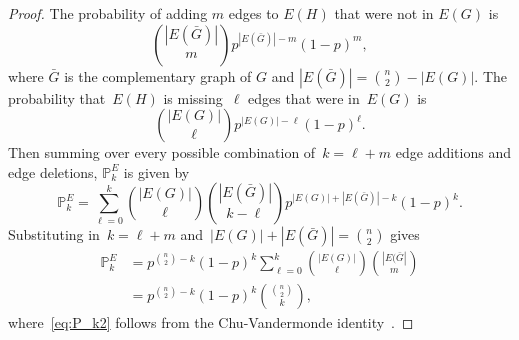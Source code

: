 \documentclass[conference]{ieeeconf}
\begin{document}
\begin{proof}
    The probability of adding $m$ edges to 
    $E(H)$ that were not in 
    $E(G)$ is 
    \begin{equation}
       { \binom{|E(\bar{G})|}{m} p^{|E(\bar{G})|-m} (1-p)^{m},}
    \end{equation}
    where $\bar{G}$ is the complementary graph of $G$ and $|E(\bar{G})| = \binom{n}{2}-|E(G)|.$
    The probability that~$E(H)$ is missing~$\ell$ edges that were in~$E(G)$ is 
    \begin{equation}
    {\binom{|E(G)|}{\ell} p^{|E(G)|-\ell} (1-p)^{\ell}.}
    \end{equation}
    Then summing over every possible combination of~$k = \ell + m$ edge additions and edge deletions, $\mathbb{P}_k^E$ is given by
    \begin{equation}
        \mathbb{P}_k^E = \sum_{\ell=0}^k \binom{|E(G)|}{\ell} \binom{|E(\bar{G})|}{k-\ell} p^{|E(G)|+|E(\bar{G})|-k} (1-p)^{k} .
    \end{equation}
    Substituting in~$k = \ell+m$ and~$|E(G)| + |E(\bar{G})| = \binom{n}{2}$ 
    gives 
    \begin{align} 
         \mathbb{P}_k^E &= p^{{\binom{n}{2}}-k} (1-p)^k \sum_{\ell=0}^k \binom{|E(G)|}{\ell} \binom{|E(\bar{G}|}{m}\\
         & = p^{{\binom{n}{2}}-k} (1-p)^k  {\binom{\binom{n}{2}}{k}},\label{eq:P_k2}
    \end{align}
    where~\eqref{eq:P_k2} follows from the Chu-Vandermonde identity~\cite[Exercise 3.2(a)]{koepf2014}.    


\end{proof}
\end{document}
